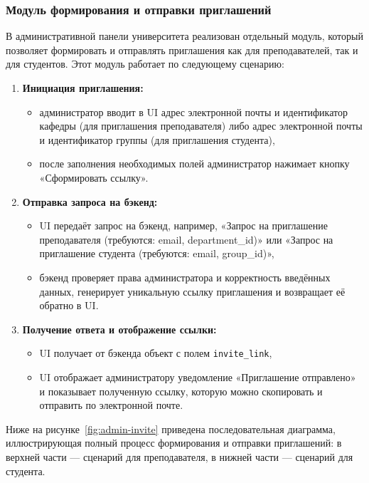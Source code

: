 \subsubsection{Модуль формирования и отправки приглашений}
В административной панели университета реализован отдельный модуль, который позволяет формировать и отправлять приглашения как для преподавателей, так и для студентов. Этот модуль работает по следующему сценарию:

\begin{enumerate}
    \item \textbf{Инициация приглашения:} 
    \begin{itemize}
        \item администратор вводит в UI адрес электронной почты и идентификатор кафедры (для приглашения преподавателя) либо адрес электронной почты и идентификатор группы (для приглашения студента),
        \item после заполнения необходимых полей администратор нажимает кнопку «Сформировать ссылку».
    \end{itemize}
    \item \textbf{Отправка запроса на бэкенд:} 
    \begin{itemize}
        \item UI передаёт запрос на бэкенд, например, «Запрос на приглашение преподавателя (требуются: email, department\_id)» или «Запрос на приглашение студента (требуются: email, group\_id)»,
        \item бэкенд проверяет права администратора и корректность введённых данных, генерирует уникальную ссылку приглашения и возвращает её обратно в UI.
    \end{itemize}
    \item \textbf{Получение ответа и отображение ссылки:} 
    \begin{itemize}
        \item UI получает от бэкенда объект с полем \texttt{invite\_link},
        \item UI отображает администратору уведомление «Приглашение отправлено» и показывает полученную ссылку, которую можно скопировать и отправить по электронной почте.
    \end{itemize}
\end{enumerate}

Ниже на рисунке~\ref{fig:admin-invite} приведена последовательная диаграмма, иллюстрирующая полный процесс формирования и отправки приглашений: в верхней части — сценарий для преподавателя, в нижней части — сценарий для студента.

